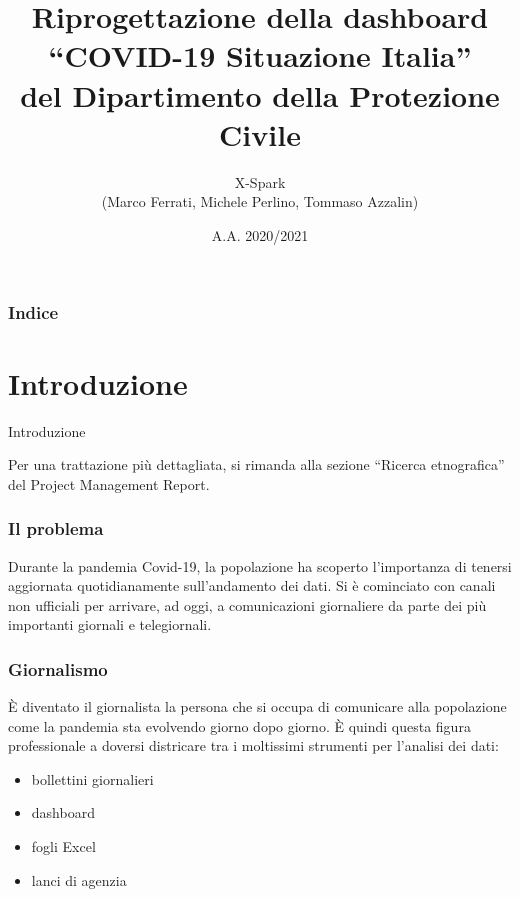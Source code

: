 \documentclass[handout]{beamer}
\title[Riprogettazione della dashboard\\``COVID-19 Situazione Italia'']{Riprogettazione della dashboard\\``COVID-19 Situazione Italia''\\del Dipartimento della Protezione Civile}
\author[X-Spark]{X-Spark\\\large(Marco Ferrati, Michele Perlino, Tommaso Azzalin)}
\institute[UniBo]{LM Informatica\\
Università di Bologna - Alma Mater Studiorum}
\date{A.A. 2020/2021}
\begin{document}
	\begin{frame}[plain]
	  \titlepage
	\end{frame}
	\begin{frame}
  		\frametitle{Indice}
		\tableofcontents
	\end{frame}
	
	\section{Introduzione}
		\begin{frame}
			\centering
			\begin{Huge}
				Introduzione
			\end{Huge}
			\mbox{}
			\vfill
			\vspace*{100px}
			\begin{tiny}
				Per una trattazione più dettagliata, si rimanda alla sezione ``Ricerca etnografica'' del Project Management Report.
			\end{tiny}
		\end{frame}
		\begin{frame}
			\frametitle{Il problema}
			Durante la pandemia Covid-19, la popolazione ha scoperto l'importanza di tenersi aggiornata quotidianamente sull'andamento dei dati.\newline \newline
			Si è cominciato con canali non ufficiali per arrivare, ad oggi, a comunicazioni giornaliere da parte dei più importanti giornali e telegiornali.
		\end{frame}

		\begin{frame}
			\frametitle{Giornalismo}
			\`E diventato il giornalista la persona che si occupa di comunicare alla popolazione come la pandemia sta evolvendo giorno dopo giorno.\newline \newline
			\`E quindi questa figura professionale a doversi districare tra i moltissimi strumenti per l'analisi dei dati:
			\begin{itemize}[<+->]
				\item bollettini giornalieri\\
				\item dashboard\\
				\item fogli Excel\\
				\item lanci di agenzia\\
			\end{itemize}
		\end{frame}
\end{document}
